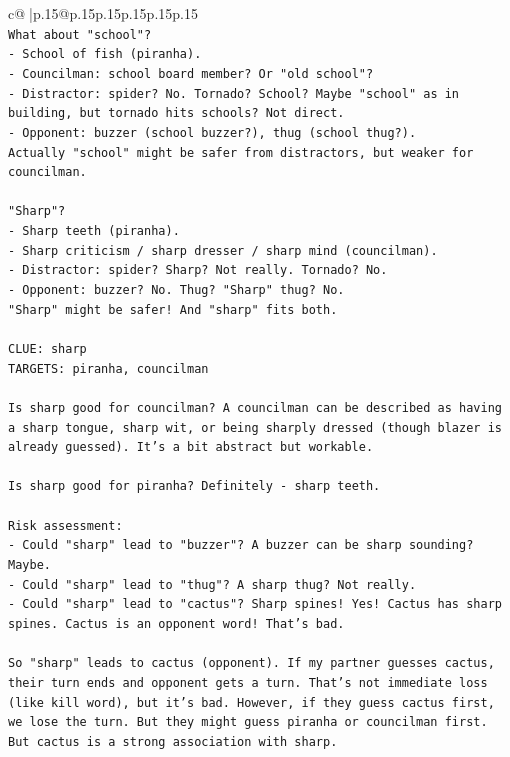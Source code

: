 \documentclass{article}
\begin{document}
{\begin{supertabular}{c@{$\;$}|p{.15\linewidth}@{}p{.15\linewidth}p{.15\linewidth}p{.15\linewidth}p{.15\linewidth}p{.15\linewidth}}
{{{\\ 
\texttt{What about "school"?} \\
\texttt{{-} School of fish (piranha).} \\
\texttt{{-} Councilman: school board member? Or "old school"?} \\
\texttt{{-} Distractor: spider? No. Tornado? School? Maybe "school" as in building, but tornado hits schools? Not direct.} \\
\texttt{{-} Opponent: buzzer (school buzzer?), thug (school thug?).} \\
\texttt{Actually "school" might be safer from distractors, but weaker for councilman.} \\
\\ 
\texttt{"Sharp"?} \\
\texttt{{-} Sharp teeth (piranha).} \\
\texttt{{-} Sharp criticism / sharp dresser / sharp mind (councilman).} \\
\texttt{{-} Distractor: spider? Sharp? Not really. Tornado? No.} \\
\texttt{{-} Opponent: buzzer? No. Thug? "Sharp" thug? No.} \\
\texttt{"Sharp" might be safer! And "sharp" fits both.} \\
\\ 
\texttt{CLUE: sharp} \\
\texttt{TARGETS: piranha, councilman} \\
\\ 
\texttt{Is sharp good for councilman? A councilman can be described as having a sharp tongue, sharp wit, or being sharply dressed (though blazer is already guessed). It's a bit abstract but workable.} \\
\\ 
\texttt{Is sharp good for piranha? Definitely {-} sharp teeth.} \\
\\ 
\texttt{Risk assessment:} \\
\texttt{{-} Could "sharp" lead to "buzzer"? A buzzer can be sharp sounding? Maybe.} \\
\texttt{{-} Could "sharp" lead to "thug"? A sharp thug? Not really.} \\
\texttt{{-} Could "sharp" lead to "cactus"? Sharp spines! Yes! Cactus has sharp spines. Cactus is an opponent word! That's bad.} \\
\\ 
\texttt{So "sharp" leads to cactus (opponent). If my partner guesses cactus, their turn ends and opponent gets a turn. That's not immediate loss (like kill word), but it's bad. However, if they guess cactus first, we lose the turn. But they might guess piranha or councilman first. But cactus is a strong association with sharp.} \\
}}}
\end{supertabular}}
\end{document}
